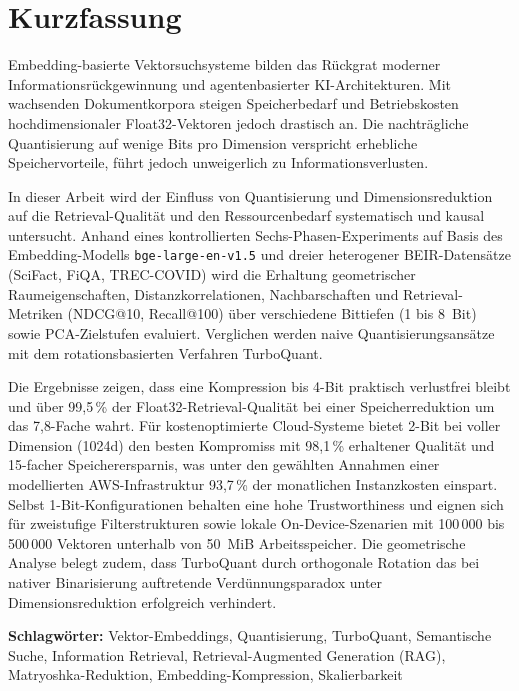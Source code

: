 \chapter*{Kurzfassung}
\label{chap:abstract}

Embedding-basierte Vektorsuchsysteme bilden das Rückgrat moderner Informationsrückgewinnung und agentenbasierter KI-Architekturen. Mit wachsenden Dokumentkorpora steigen Speicherbedarf und Betriebskosten hochdimensionaler Float32-Vektoren jedoch drastisch an. Die nachträgliche Quantisierung auf wenige Bits pro Dimension verspricht erhebliche Speichervorteile, führt jedoch unweigerlich zu Informationsverlusten. 

In dieser Arbeit wird der Einfluss von Quantisierung und Dimensionsreduktion auf die Retrieval-Qualität und den Ressourcenbedarf systematisch und kausal untersucht. Anhand eines kontrollierten Sechs-Phasen-Experiments auf Basis des Embedding-Modells \texttt{bge-large-en-v1.5} und dreier heterogener BEIR-Datensätze (SciFact, FiQA, TREC-COVID) wird die Erhaltung geometrischer Raumeigenschaften, Distanzkorrelationen, Nachbarschaften und Retrieval-Metriken (NDCG@10, Recall@100) über verschiedene Bittiefen (1 bis 8~Bit) sowie PCA-Zielstufen evaluiert. Verglichen werden naive Quantisierungsansätze mit dem rotationsbasierten Verfahren TurboQuant.

Die Ergebnisse zeigen, dass eine Kompression bis 4-Bit praktisch verlustfrei bleibt und über 99{,}5\,\% der Float32-Retrieval-Qualität bei einer Speicherreduktion um das 7{,}8-Fache wahrt. Für kostenoptimierte Cloud-Systeme bietet 2-Bit bei voller Dimension (1024d) den besten Kompromiss mit 98{,}1\,\% erhaltener Qualität und 15-facher Speicherersparnis, was unter den gewählten Annahmen einer modellierten AWS-Infrastruktur 93{,}7\,\% der monatlichen Instanzkosten einspart. Selbst 1-Bit-Konfigurationen behalten eine hohe Trustworthiness und eignen sich für zweistufige Filterstrukturen sowie lokale On-Device-Szenarien mit 100\,000 bis 500\,000 Vektoren unterhalb von 50~MiB Arbeitsspeicher. Die geometrische Analyse belegt zudem, dass TurboQuant durch orthogonale Rotation das bei nativer Binarisierung auftretende Verdünnungsparadox unter Dimensionsreduktion erfolgreich verhindert.

\vspace{0.5cm}
\noindent\textbf{Schlagwörter:} Vektor-Embeddings, Quantisierung, TurboQuant, Semantische Suche, Information Retrieval, Retrieval-Augmented Generation (RAG), Matryoshka-Reduktion, Embedding-Kompression, Skalierbarkeit